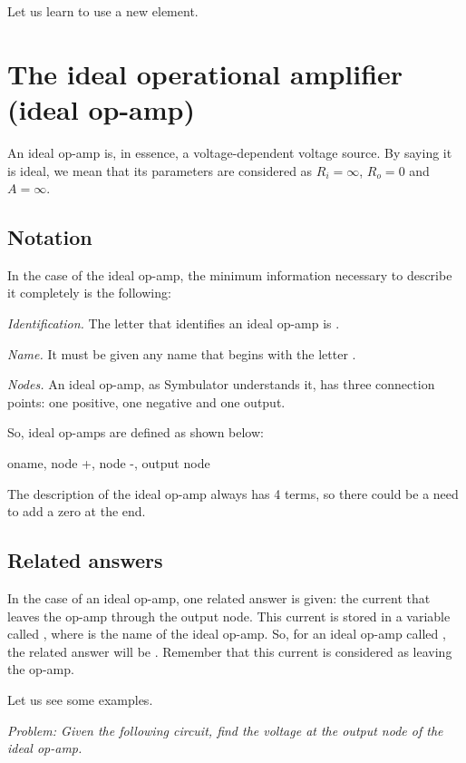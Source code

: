 Let us learn to use a new element.

\section{The ideal operational amplifier (ideal op-amp)}

An ideal op-amp is, in essence, a voltage-dependent voltage source.
By saying it is ideal, we mean that its parameters are considered as
$R_i = \infty$, $R_o = 0$ and $A = \infty$.

\subsection{Notation}

In the case of the ideal op-amp, the minimum information necessary
to describe it completely is the following:

\emph{Identification.} The letter that identifies an ideal op-amp is
.

\emph{Name.} It must be given any name that begins with the letter
.

\emph{Nodes.} An ideal op-amp, as Symbulator understands it, has
three connection points: one positive, one negative and one output.

So, ideal op-amps are defined as shown below:

\begin{entry}
oname, node +, node -, output node
\end{entry}

The description of the ideal op-amp always has 4 terms, so there
could be a need to add a zero at the end.

\subsection{Related answers}

In the case of an ideal op-amp, one related answer is given: the
current that leaves the op-amp through the output node. This current
is stored in a variable called , where  is
the name of the ideal op-amp. So, for an ideal op-amp called
, the related answer will be . Remember that this
current is considered as leaving the op-amp.

Let us see some examples.


\emph{Problem: Given the following circuit, find the voltage at the
output node of the ideal op-amp.}

